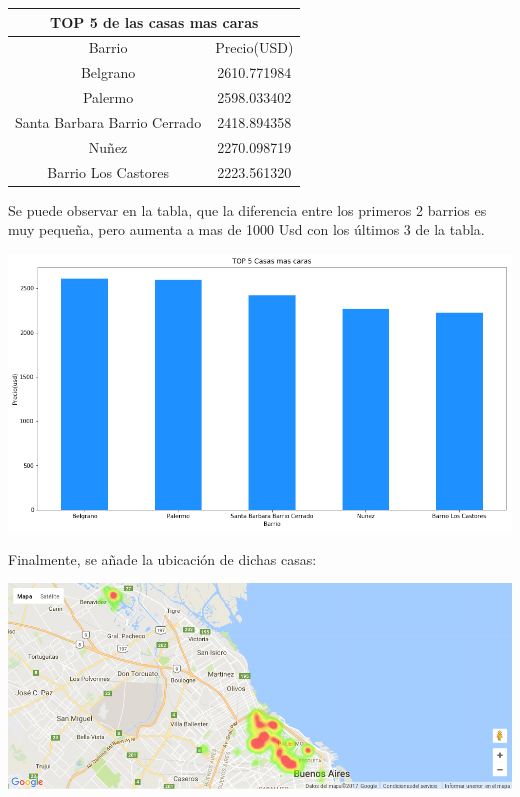 \documentclass[a4paper, 10pt]{article}
\begin{document}
					\begin{center}
						\begin{tabular}{ |c|c| }
							\hline
							\multicolumn{2}{|c|}{TOP 5 de las casas mas caras}\\
							\hline
							\hline
							Barrio & Precio(USD)\\
							\hline
							 Belgrano & 2610.771984 \\
							 Palermo & 2598.033402 \\
							 Santa Barbara Barrio Cerrado & 2418.894358 \\
							 Nuñez & 2270.098719 \\
							 Barrio Los Castores & 2223.561320 \\
							\hline
						\end{tabular}
					\end{center}

				Se puede observar en la tabla, que la diferencia entre los primeros 2 barrios es muy pequeña, pero aumenta a mas de 1000 Usd con los últimos 3 de la tabla.

				\begin{center}
   		    				\includegraphics[width=\textwidth]{images/topCc}
				\end{center}

				Finalmente, se añade la ubicación de dichas casas:

				\begin{center}
   		    				\includegraphics[width=\textwidth]{images/ubicCc}
				\end{center}
\end{document}

